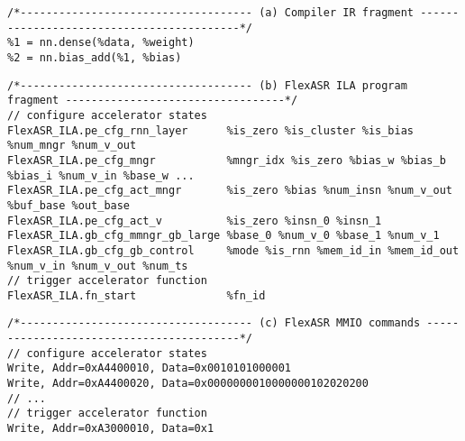 
\begin{lstlisting}[style=mapping-style,backgroundcolor=\color{lightblue}]
/*------------------------------------ (a) Compiler IR fragment ------------------------------------------*/ 
%1 = nn.dense(%data, %weight)
%2 = nn.bias_add(%1, %bias)
\end{lstlisting}

\begin{lstlisting}[style=mapping-style,backgroundcolor=\color{lightorange}]
/*------------------------------------ (b) FlexASR ILA program fragment ----------------------------------*/ 
// configure accelerator states
FlexASR_ILA.pe_cfg_rnn_layer      %is_zero %is_cluster %is_bias %num_mngr %num_v_out
FlexASR_ILA.pe_cfg_mngr           %mngr_idx %is_zero %bias_w %bias_b %bias_i %num_v_in %base_w ...
FlexASR_ILA.pe_cfg_act_mngr       %is_zero %bias %num_insn %num_v_out %buf_base %out_base
FlexASR_ILA.pe_cfg_act_v          %is_zero %insn_0 %insn_1
FlexASR_ILA.gb_cfg_mmngr_gb_large %base_0 %num_v_0 %base_1 %num_v_1
FlexASR_ILA.gb_cfg_gb_control     %mode %is_rnn %mem_id_in %mem_id_out %num_v_in %num_v_out %num_ts
// trigger accelerator function
FlexASR_ILA.fn_start              %fn_id
\end{lstlisting}

\begin{lstlisting}[style=mapping-style,backgroundcolor=\color{lightgray}]
/*------------------------------------ (c) FlexASR MMIO commands -----------------------------------------*/ 
// configure accelerator states
Write, Addr=0xA4400010, Data=0x0010101000001
Write, Addr=0xA4400020, Data=0x0000000010000000102020200
// ...
// trigger accelerator function
Write, Addr=0xA3000010, Data=0x1
\end{lstlisting}
